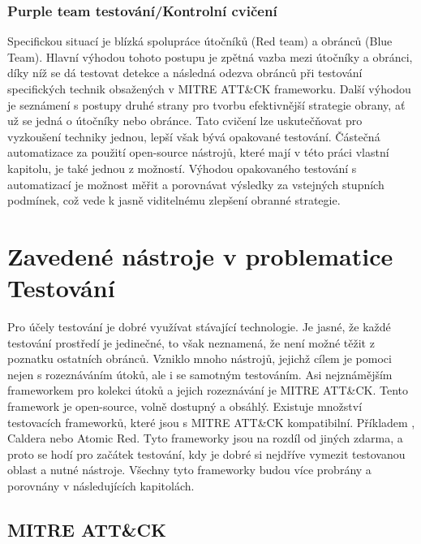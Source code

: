 \subsubsection{Purple team testování/Kontrolní cvičení}
Specifickou situací je blízká spolupráce útočníků (Red team) a obránců (Blue Team).
Hlavní výhodou tohoto postupu je zpětná vazba mezi útočníky a obránci, díky níž se dá testovat detekce a následná odezva obránců při testování specifických technik obsažených v MITRE ATT\&CK frameworku.
Další výhodou je seznámení s postupy druhé strany pro tvorbu efektivnější strategie obrany, ať už se jedná o útočníky nebo obránce.
Tato cvičení lze uskutečňovat pro vyzkoušení techniky jednou, lepší však bývá opakované testování.
Částečná automatizace za použití open-source nástrojů, které mají v této práci vlastní kapitolu, je také jednou z možností.
Výhodou opakovaného testování s automatizací je možnost měřit a porovnávat výsledky za vstejných stupních podmínek, což vede k jasně viditelnému zlepšení obranné strategie.\cite{securityInteligence_pen_test_red_team_purple_team,redscan_team_purple_team}

\section{Zavedené nástroje v problematice Testování}\label{sec:zavedene-nastroje-v-problematice-testovani}
Pro účely testování je dobré využívat stávající technologie.
Je jasné, že každé testování prostředí je jedinečné, to však neznamená, že není možné těžit z poznatku ostatních obránců.
Vzniklo mnoho nástrojů, jejichž cílem je pomoci nejen s rozeznáváním útoků, ale i se samotným testováním.
Asi nejznámějším frameworkem pro kolekci útoků a jejich rozeznávání je MITRE ATT\&CK\cite{mitre_attack_framework}.
Tento framework je open-source, volně dostupný a obsáhlý.
Existuje množství testovacích frameworků, které jsou s MITRE ATT\&CK kompatibilní\cite{csoonline_4_testing_frameworks}.
Příkladem , Caldera nebo Atomic Red.
Tyto frameworky jsou na rozdíl od jiných zdarma, a proto se hodí pro začátek testování, kdy je dobré si nejdříve vymezit testovanou oblast a nutné nástroje.
Všechny tyto frameworky budou více probrány a porovnány v následujících kapitolách.

\subsection{MITRE ATT\&CK}\label{subsec:mitre-att&ck}
~

